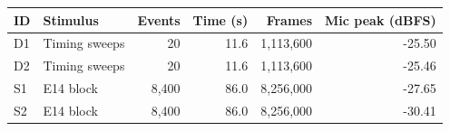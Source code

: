 \begin{tabular}{@{}llrrrr@{}}
\toprule
ID & Stimulus & Events & Time (s) & Frames & Mic peak (dBFS) \\
\midrule
D1 & Timing sweeps & 20 & 11.6 & 1,113,600 & -25.50 \\
D2 & Timing sweeps & 20 & 11.6 & 1,113,600 & -25.46 \\
S1 & E14 block & 8,400 & 86.0 & 8,256,000 & -27.65 \\
S2 & E14 block & 8,400 & 86.0 & 8,256,000 & -30.41 \\
\bottomrule
\end{tabular}
